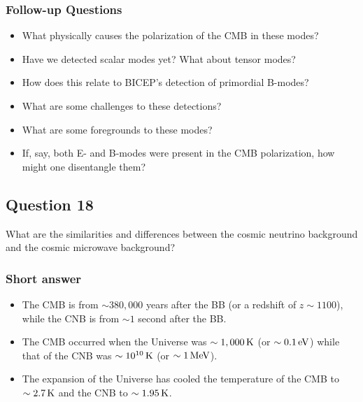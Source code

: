 \documentclass[a4paper,11pt]{article}
\begin{document}
\subsubsection{Follow-up Questions}

\begin{itemize}
    \item What physically causes the polarization of the CMB in these modes?
    \item Have we detected scalar modes yet? What about tensor modes?
    \item How does this relate to BICEP's detection of primordial B-modes?
    \item What are some challenges to these detections?
    \item What are some foregrounds to these modes?
    \item If, say, both E- and B-modes were present in the CMB polarization, how might one disentangle them?
\end{itemize}

%
%

\newpage
\subsection{Question 18}

What are the similarities and differences between the cosmic neutrino background and the cosmic microwave background?

\subsubsection{Short answer}

\begin{itemize}
    \item The CMB is from $\sim380,000$ years after the BB (or a redshift of $z\sim1100$), while the CNB is from $\sim1$ second after the BB.
    \item The CMB occurred when the Universe was $\sim1,000\,{\rm K}$ (or $\sim0.1\,{\rm eV}$) while that of the CNB was $\sim10^{10}\,{\rm K}$ (or $\sim1\,{\rm MeV}$).
    \item The expansion of the Universe has cooled the temperature of the CMB to $\sim2.7\,{\rm K}$ and the CNB to $\sim1.95\,{\rm K}$.
\end{itemize}
\end{document}
